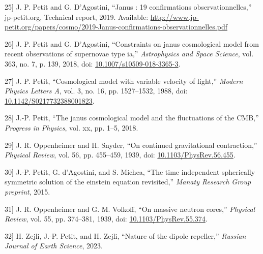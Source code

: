 \documentclass[11pt]{article}
\newlength{\cslhangindent}
\newenvironment{CSLReferences}[2]%
{\par
\noindent\setlength{\parindent}{0pt}}%
{\par}
\newcommand{\CSLLeftMargin}[1]{\hspace*{\cslhangindent}#1}
\newcommand{\CSLRightInline}[1]{#1}
\begin{document}
\begin{CSLReferences}{0}{0}
\leavevmode{}%
\CSLLeftMargin{{[}25{]} }
\CSLRightInline{J. P. Petit and G. D'Agostini, {``Janus : 19
confirmations observationnelles,''} jp-petit.org, Technical report,
2019. Available:
\url{http://www.jp-petit.org/papers/cosmo/2019-Janus-confirmations-observationnelles.pdf}}

\leavevmode{}%
\CSLLeftMargin{{[}26{]} }
\CSLRightInline{J. P. Petit and G. D'Agostini, {``Constraints on janus
cosmological model from recent observations of supernovae type ia,''}
\emph{Astrophysics and Space Science}, vol. 363, no. 7, p. 139, 2018,
doi:
\href{https://doi.org/10.1007/s10509-018-3365-3}{10.1007/s10509-018-3365-3}.}

\leavevmode{}%
\CSLLeftMargin{{[}27{]} }
\CSLRightInline{J. P. Petit, {``Cosmological model with variable
velocity of light,''} \emph{Modern Physics Letters A}, vol. 3, no. 16,
pp. 1527--1532, 1988, doi:
\href{https://doi.org/10.1142/S0217732388001823}{10.1142/S0217732388001823}.}

\leavevmode{}%
\CSLLeftMargin{{[}28{]} }
\CSLRightInline{J.-P. Petit, {``The janus cosmological model and the
fluctuations of the CMB,''} \emph{Progress in Physics}, vol. xx, pp.
1--5, 2018.}

\leavevmode{}%
\CSLLeftMargin{{[}29{]} }
\CSLRightInline{J. R. Oppenheimer and H. Snyder, {``On continued
gravitational contraction,''} \emph{Physical Review}, vol. 56, pp.
455--459, 1939, doi:
\href{https://doi.org/10.1103/PhysRev.56.455}{10.1103/PhysRev.56.455}.}

\leavevmode{}%
\CSLLeftMargin{{[}30{]} }
\CSLRightInline{J.-P. Petit, G. d'Agostini, and S. Michea, {``The time
independent spherically symmetric solution of the einstein equation
revisited,''} \emph{Manaty Research Group preprint}, 2015.}

\leavevmode{}%
\CSLLeftMargin{{[}31{]} }
\CSLRightInline{J. R. Oppenheimer and G. M. Volkoff, {``On massive
neutron cores,''} \emph{Physical Review}, vol. 55, pp. 374--381, 1939,
doi:
\href{https://doi.org/10.1103/PhysRev.55.374}{10.1103/PhysRev.55.374}.}

\leavevmode{}%
\CSLLeftMargin{{[}32{]} }
\CSLRightInline{H. Zejli, J.-P. Petit, and H. Zejli, {``Nature of the
dipole repeller,''} \emph{Russian Journal of Earth Science}, 2023.}


\end{CSLReferences}
\end{document}
